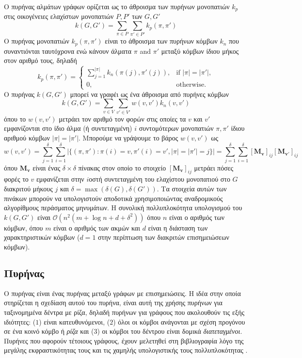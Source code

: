 Ο πυρήνας αλμάτων γράφων ορίζεται ως το άθροισμα των πυρήνων μονοπατιών $k_p$ στις οικογένειες ελαχίστων μονοπατιών $P, P'$ των $G,G'$
\begin{equation}
    k(G,G') = \sum_{\pi \in P} \sum_{\pi' \in P'} k_p(\pi, \pi')
\end{equation}
Ο πυρήνας μονοπατιών $k_p(\pi, \pi')$ είναι το άθροισμα των πυρήνων κόμβων $k_n$ που συναντιόνται ταυτόχρονα ενώ κάνουν άλματα $\pi$ and $\pi'$ μεταξύ κόμβων ίδιου μήκος στον αριθμό τους, δηλαδή
\begin{equation}
    k_p(\pi, \pi') = \begin{cases}
        \sum_{j=1}^{|\pi|} k_n(\pi(j), \pi'(j)), & \text{if $|\pi| = |\pi'|$},\\
        0, & \text{otherwise.} 
        \end{cases}
\end{equation}
Ο πυρήνας $k(G,G')$ μπορεί να γραφέι ως ένα άθροισμα από πυρήνες κόμβων
\begin{equation}
    k(G,G') = \sum_{v \in V} \sum_{v' \in V'} w(v,v') k_n(v, v')
\end{equation}
όπου το $w(v,v')$ μετράει τον αριθμό τον φορών στις οποίες τα $v$ και $v'$ εμφανίζονται στο ίδιο άλμα (ή συντεταγμένη) $i$ συντομότερων μονοπατιών $\pi,\pi'$ ίδιου αριθμού κόμβων $|\pi| = |\pi'|$.
Μπορούμε να γράψουμε το βάρος $w(v,v')$ ως
\begin{equation}
    w(v,v') = \sum_{j=1}^\delta \sum_{i=1}^\delta | \{ (\pi,\pi') : \pi(i)=v, \pi'(i)=v', |\pi|=|\pi'|=j \} | = \sum_{j=1}^\delta \sum_{i=1}^\delta [\mathbf{M_v}]_{ij} [\mathbf{M_{v'}}]_{ij}
\end{equation}
όπου $\mathbf{M_v}$ είναι ένας $\delta \times \delta$ πίνακας στον οποίο το στοιχείο $[\mathbf{M_v}]_{ij}$ μετράει πόσες φορές το $v$ εμφανίζεται στην $i$οστή συντεταγμένη του ελαχίστου μονοπατιού στο $G$ διακριτού μήκους $j$ και $\delta = \max(\delta(G), \delta(G'))$.
Τα στοιχεία αυτών των πινάκων μπορούν να υπολογιστούν αποδοτικά χρησιμοποιώντας αναδρομικούς αλγορίθμους περάσματος μηνυμάτων. 
Η συνολική πολλυπλοκότητα υπολογισμού του $k(G,G')$ είναι $\mathcal{O}(n^2(m + \log n + d + \delta^2))$ όπου $n$ είναι ο αριθμός των κόμβων, όπου $m$ είναι ο αριθμός των ακμών και $d$ είναι η διάσταση των χαρακτηριστικών κόμβων ($d=1$ στην περίπτωση των διακριτών επισημειώσεων κόμβων).
\subsection{Πυρήνας }
Ο πυρήνας  είναι ένας πυρήνας μεταξύ γράφων με επισημειώσεις.
Η ιδέα στην οποία στηρίζεται η σχεδίαση αυτού του πυρήνα, είναι αυτή της χρήσης πυρήνων για ταξινομημένα δέντρα με ρίζα, δηλαδή πυρήνων για γράφους που ακολουθούν τις εξής ιδιότητες: ($1$) είναι κατευθυνόμενοι, ($2$) όλοι οι κόμβοι ανάγονται με σχέση προγόνου σε ένα κοινό κόμβο ή \textit{ρίζα} και ($3$) οι κόμβοι του δέντρου είναι δομικά \textit{διατεταγμένοι}.
Πυρήνες που αφορούν τέτοιους γράφους, έχουν μελετηθεί στη βιβλιογραφία λόγο της μεγάλης εκφραστικότητας τους και τις χαμηλής υπολογιστικής τους πολλυπλοκότητας \cite{Haussler99ck, MA_ECML_2006, Vishwanathan2002}.

